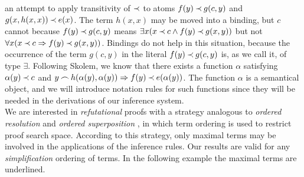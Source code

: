 an attempt to apply transitivity of $\mathbin{\prec}$ to atoms \(f(y)\mathbin{\prec} g(c,y)\) and
\( g(x,h(x,x))\mathbin{\prec} e(x)\).  The term $h(x,x)$ may be moved into a binding,
but $c$ cannot because \(f(y)\mathbin{\prec} g(c,y)\) means \(\exists x(x\mathbin{\prec} c\land
f(y)\mathbin{\prec} g(x,y))\) but not \(\forall x(x\mathbin{\prec} c\mathrel\Rightarrow f(y)\mathbin{\prec} g(x,y))\).
Bindings do not help in this situation, because the occurrence of the term $g(c,y)$ 
in the literal \(f(y)\mathbin{\prec} g(c,y)\) is, as we call it, of type $\exists$.  
Following Skolem, we know that
there exists a function $\alpha$ satisfying \(\alpha(y)\mathbin{\prec} c\) and \(y\mathbin{\frown}
h(\alpha(y),\alpha(y))\mathrel\Rightarrow f(y)\mathbin{\prec} e(\alpha(y))\).  The function $\alpha$
is a semantical object, and we will introduce notation rules for such
functions since they will be needed in the derivations of 
our inference system.\\[1ex]
%
We are interested in {\em refutational} proofs with a strategy analogous
to {\em ordered resolution} and {\em ordered superposition} \cite{BG,PP,S-A},
in which term ordering is used to restrict proof search space.  According to this
strategy, only maximal terms may be involved in the applications of
the inference rules. Our results are valid for any {\em simplification} ordering
\cite {Der} of terms.  In the following example the maximal terms are underlined.

